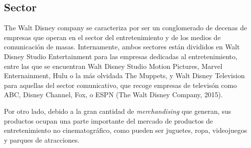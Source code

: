 \subsection{Sector}

The Walt Disney company se caracteriza por ser un conglomerado de decenas de empresas que operan en el sector del entretenimiento y de los medios de comunicación de masas. Internamente, ambos sectores están divididos en Walt Disney Studio Entertainment para las empresas dedicadas al entretenimiento, entre las que se encuentran Walt Disney Studio Motion Pictures, Marvel Enternainment, Hulu o la más olvidada The Muppets, y Walt Disney Television para aquellas del sector comunicativo, que recoge empresas de televisón como ABC, Disney Channel, Fox, o ESPN (The Walt Disney Company, 2015).

Por otro lado, debido a la gran cantidad de \textit{merchandising} que generan, sus productos ocupan una parte importante del mercado de productos de entretenimiento no cinematográfico, como pueden ser juguetes, ropa, videojuegos y parques de atracciones.